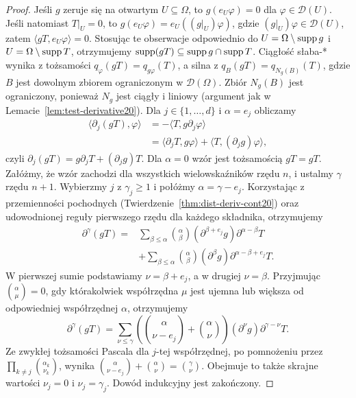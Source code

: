 \begin{proof}
Jeśli $g$ zeruje się na otwartym $U\subseteq\Omega$, to
$g(e_U\varphi)=0$ dla $\varphi\in\mathcal D(U)$.
Jeśli natomiast $T|_U=0$, to
$g(e_U\varphi)=e_U((g|_U)\varphi)$, gdzie
$(g|_U)\varphi\in\mathcal D(U)$, zatem
$\langle gT,e_U\varphi\rangle=0$.
Stosując te obserwacje odpowiednio do
$U=\Omega\setminus\operatorname{supp} g$ i $U=\Omega\setminus\operatorname{supp} T$,
otrzymujemy $\operatorname{supp}(gT)\subseteq\operatorname{supp} g\cap\operatorname{supp} T$.
Ciągłość słaba-* wynika z tożsamości
$q_\varphi(gT)=q_{g\varphi}(T)$, a silna z
$q_B(gT)=q_{N_g(B)}(T)$, gdzie $B$ jest dowolnym zbiorem
ograniczonym w $\mathcal D(\Omega)$.
Zbiór $N_g(B)$ jest ograniczony, ponieważ $N_g$ jest
ciągły i liniowy (argument jak w Lemacie~\ref{lem:test-derivative20}).
Dla $j\in\{1,\ldots,d\}$ i $\alpha=e_j$ obliczamy
\[
 \begin{aligned}
 \langle\partial_j(gT),\varphi\rangle
 &=-\langle T,g\partial_j\varphi\rangle\\
 &=\langle\partial_jT,g\varphi\rangle
   +\langle T,(\partial_jg)\varphi\rangle,
 \end{aligned}
\]
czyli $\partial_j(gT)=g\partial_jT+(\partial_jg)T$.
Dla $\alpha=0$ wzór jest tożsamością $gT=gT$.
Załóżmy, że wzór zachodzi dla wszystkich wielowskaźników
rzędu $n$, i ustalmy $\gamma$ rzędu $n+1$.
Wybierzmy $j$ z $\gamma_j\ge1$ i połóżmy $\alpha=\gamma-e_j$.
Korzystając z przemienności pochodnych
(Twierdzenie~\ref{thm:dist-deriv-cont20}) oraz udowodnionej
reguły pierwszego rzędu dla każdego składnika, otrzymujemy
\[
\begin{aligned}
\partial^\gamma(gT)
={}&\sum_{\beta\le\alpha}\binom\alpha\beta
(\partial^{\beta+e_j}g)\partial^{\alpha-\beta}T\\
&+\sum_{\beta\le\alpha}\binom\alpha\beta
(\partial^\beta g)\partial^{\alpha-\beta+e_j}T.
\end{aligned}
\]
W pierwszej sumie podstawiamy $\nu=\beta+e_j$, a w drugiej
$\nu=\beta$. Przyjmując $\binom\alpha\mu=0$, gdy którakolwiek
współrzędna $\mu$ jest ujemna lub większa od odpowiedniej
współrzędnej $\alpha$, otrzymujemy
\[
\partial^\gamma(gT)=\sum_{\nu\le\gamma}
\left(\binom\alpha{\nu-e_j}+\binom\alpha\nu\right)
(\partial^\nu g)\partial^{\gamma-\nu}T.
\]
Ze zwykłej tożsamości Pascala dla $j$-tej współrzędnej,
po pomnożeniu przez $\prod_{k\ne j}\binom{\alpha_k}{\nu_k}$,
wynika $\binom\alpha{\nu-e_j}+\binom\alpha\nu=\binom\gamma\nu$.
Obejmuje to także skrajne wartości $\nu_j=0$ i $\nu_j=\gamma_j$.
Dowód indukcyjny jest zakończony.
\end{proof}

